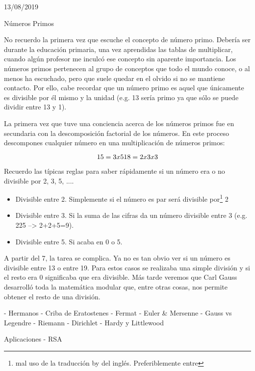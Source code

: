 13/08/2019


Números Primos

No recuerdo la primera vez que escuche el concepto de número primo. Debería ser durante la educación primaria, una vez aprendidas las tablas de multiplicar, cuando algún profesor me inculcó ese concepto sin aparente importancia. Los números primos pertenecen al grupo de conceptos que todo el mundo conoce, o al menos ha escuchado, pero que suele quedar en el olvido si no se mantiene contacto. Por ello, cabe recordar que un número primo es aquel que únicamente es divisible por él mismo y la unidad (e.g. 13 sería primo ya que sólo se puede dividir entre 13 y 1). 

La primera vez que tuve una conciencia acerca de los números primos fue en secundaria con la descomposición factorial de los números. En este proceso descompones cualquier número en una multiplicación de números primos:

\begin{equation}
	15 = 3 x 5 \\ [.3em]
	18 = 2 x 3 x 3
\end{equation}

Recuerdo las típicas reglas para saber rápidamente si un número era o no divisible por 2, 3, 5, ....

\begin{itemize}
	\item Divisible entre 2. Simplemente si el número es par será divisible por\footnote{mal uso de la traducción by del inglés. Preferiblemente entre} 2
	\item Divisible entre 3. Si la suma de las cifras da un número divisible entre 3 (e.g. 225 --> 2+2+5=9).
	\item Divisible entre 5. Si acaba en 0 o 5.
\end{itemize}

A partir del 7, la tarea se complica. Ya no es tan obvio ver si un número es divisible entre 13 o entre 19. Para estos casos se realizaba una simple división y si el resto era 0 significaba que era divisible. Más tarde veremos que Carl Gauss desarrolló toda la matemática modular que, entre otras cosas, nos permite obtener el resto de una división.

- Hermanos
- Criba de Eratostenes
- Fermat
- Euler & Mersenne
- Gauss vs Legendre
- Riemann
- Dirichlet
- Hardy y Littlewood


Aplicaciones
- RSA


